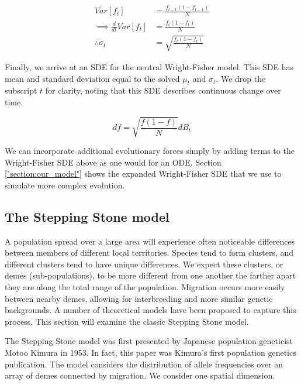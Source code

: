 
\begin{equation}
    \begin{split}
         Var[f_t] &= \frac{f_{t-1}(1-f_{t-1})}{N} \\
         \implies \frac{d}{dt} Var[f_t] &= \frac{f_t(1-f_t)}{N} \\
         \therefore \sigma_t &= \sqrt{\frac{f_t(1-f_t)}{N}}
    \end{split}
\end{equation}

Finally, we arrive at an SDE for the neutral Wright-Fisher model. This SDE has mean and standard deviation equal to the solved $\mu_t$ and $\sigma_t$. We drop the subscript $t$ for clarity, noting that this SDE describes continuous change over time. 

\begin{equation}
    df = \sqrt{\frac{f(1-f)}{N}} dB_t
\end{equation}


We can incorporate additional evolutionary forces simply by adding terms to the Wright-Fisher SDE above as one would for an ODE. Section \ref{"section:our_model"} shows the expanded Wright-Fisher SDE that we use to simulate more complex evolution. 


\subsection{The Stepping Stone model}

A population spread over a large area will experience often noticeable differences between members of different local territories. Species tend to form clusters, and different clusters tend to have unique differences. We expect these clusters, or demes (sub-populations), to be more different from one another the farther apart they are along the total range of the population. Migration occurs more easily between nearby demes, allowing for interbreeding and more similar genetic  backgrounds. A number of theoretical models have been proposed to capture this process.\cite{wright_1943} \cite{malecot_1959} This section will examine the classic Stepping Stone model. 

The Stepping Stone model was first presented by Japanese population geneticist Motoo Kimura in 1953. \cite{kimura_1953} In fact, this paper was Kimura's first population genetics publication. \cite{crow_1994} The model considers the distribution of allele frequencies over an array of demes connected by migration. We consider one spatial dimension. 

